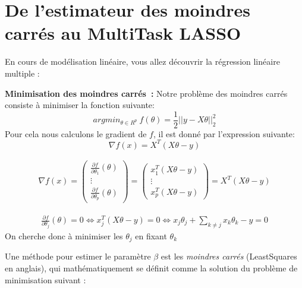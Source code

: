 \documentclass{article}
\begin{document}
\section*{De l'estimateur des moindres carrés au MultiTask LASSO} \vspace{.5cm}

En cours de modélisation linéaire, vous allez découvrir la régression linéaire multiple :

\textbf{Minimisation des moindres carrés\ :} Notre problème des moindres carrés consiste à minimiser la fonction suivante: \\
$$ argmin_{\theta\in R^p}\ f(\theta)=\frac{1}{2} ||{y - X\theta}||_2^2
 $$
Pour cela nous calculons le gradient de $f$, il est donné par l'expression suivante:\\
$$ \nabla f(x)=X^T(X \theta -y) $$

\begin{align*}
    \nabla f(x) = \begin{pmatrix}
        \frac{\partial f}{\partial \theta_1} (\theta) \\ \vdots \\ \frac{\partial f}{\partial \theta_p} (\theta)
    \end{pmatrix}= \begin{pmatrix}
        x_1^T(X \theta -y) \\ \vdots \\ x_p^T(X \theta -y)
    \end{pmatrix} =X^T(X \theta -y)
\end{align*}
	 
\begin{align*}
    \frac{\partial f}{\partial \theta_j} (\theta) = 0\Longleftrightarrow x_j^T(X \theta -y)= 0 \Longleftrightarrow x_j\theta_j + \sum_{k \ne j} x_k\theta_k - y = 0
\end{align*}
On cherche donc à minimiser les $\theta_j$ en fixant $\theta_k$


Une méthode pour estimer le paramètre $\beta$ est les \textit{moindres carrés} (LeastSquares en anglais), qui mathématiquement se définit comme la solution du problème de minimisation suivant :
\end{document}
